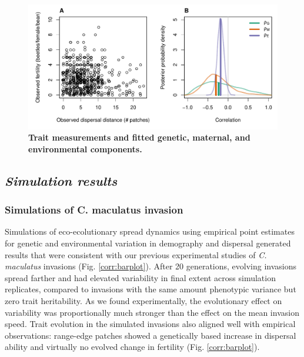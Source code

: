 \documentclass[11pt]{article}
\newcommand{\tom}[1]{{\textit{\color{WildStrawberry}{[#1]}}}}
\begin{document}

\newpage
\begin{figure}[h!]
\centering
\includegraphics[width=0.8\linewidth]{Figures/data_corr_posteriors.pdf}
\caption{\textbf{Trait measurements and fitted genetic, maternal, and environmental components.}}\label{corr:post}
\end{figure}


\newpage
\subsection*{\textit{Simulation results}}
\subsubsection*{Simulations of \textup{C. maculatus} invasion}
Simulations of eco-ecolutionary spread dynamics using empirical point estimates for genetic and environmental variation in demography and dispersal generated results that were consistent with our previous experimental studies of \textit{C. maculatus} invasions (Fig. \ref{corr:barplot}).
After 20 generations, evolving invasions spread farther and had elevated variability in final extent across simulation replicates, compared to invasions with the same amount phenotypic variance but zero trait heritability.
As we found experimentally, the evolutionary effect on variability was proportionally much stronger than the effect on the mean invasion speed.
Trait evolution in the simulated invasions also aligned well with empirical observations: range-edge patches showed a genetically based increase in dispersal ability and virtually no evolved change in fertility (Fig. \ref{corr:barplot}).
\end{document}
